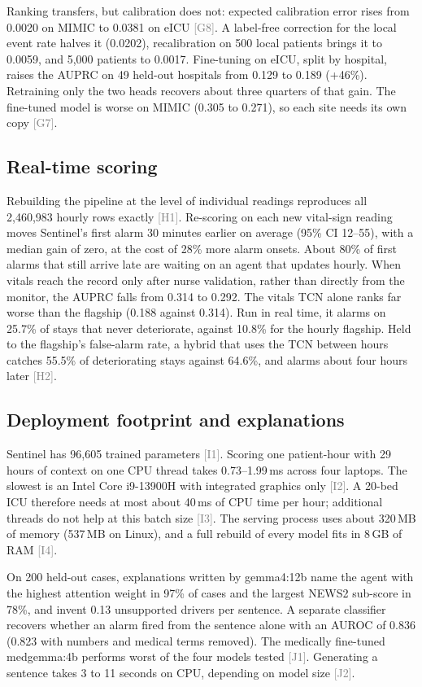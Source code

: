 \documentclass[11pt]{article}
\newcommand{\ev}[1]{\textcolor{gray}{\scriptsize[#1]}}   %
\begin{document}
Ranking transfers, but calibration does not: expected calibration error rises
from 0.0020 on MIMIC to 0.0381 on eICU \ev{G8}. A label-free correction for the
local event rate halves it (0.0202), recalibration on 500 local patients brings
it to 0.0059, and 5{,}000 patients to 0.0017. Fine-tuning on eICU, split by
hospital, raises the AUPRC on 49 held-out hospitals from 0.129 to 0.189 (+46\%).
Retraining only the two heads recovers about three quarters of that gain. The
fine-tuned model is worse on MIMIC (0.305 to 0.271), so each site needs its own
copy \ev{G7}.

\subsection{Real-time scoring}
Rebuilding the pipeline at the level of individual readings reproduces all
2{,}460{,}983 hourly rows exactly \ev{H1}. Re-scoring on each new vital-sign
reading moves Sentinel's first alarm 30 minutes earlier on average (95\% CI
12--55), with a median gain of zero, at the cost of 28\% more alarm onsets. About
80\% of first alarms that still arrive late are waiting on an agent that updates
hourly. When vitals reach the record only after nurse validation, rather than
directly from the monitor, the AUPRC falls from 0.314 to 0.292. The vitals TCN
alone ranks far worse than the flagship (0.188 against 0.314). Run in real time,
it alarms on 25.7\% of stays that never deteriorate, against 10.8\% for the
hourly flagship. Held to the flagship's false-alarm rate, a hybrid that uses the
TCN between hours catches 55.5\% of deteriorating stays against 64.6\%, and
alarms about four hours later \ev{H2}.

\subsection{Deployment footprint and explanations}
Sentinel has 96{,}605 trained parameters \ev{I1}. Scoring one patient-hour with
29 hours of context on one CPU thread takes 0.73--1.99\,ms across four laptops.
The slowest is an Intel Core i9-13900H with integrated graphics only \ev{I2}. A
20-bed ICU therefore needs at most about 40\,ms of CPU time per hour; additional
threads do not help at this batch size \ev{I3}. The serving process uses about
320\,MB of memory (537\,MB on Linux), and a full rebuild of every model fits in
8\,GB of RAM \ev{I4}.

On 200 held-out cases, explanations written by gemma4:12b name the agent with
the highest attention weight in 97\% of cases and the largest NEWS2 sub-score in
78\%, and invent 0.13 unsupported drivers per sentence. A separate classifier
recovers whether an alarm fired from the sentence alone with an AUROC of 0.836
(0.823 with numbers and medical terms removed). The medically fine-tuned
medgemma:4b performs worst of the four models tested \ev{J1}. Generating a
sentence takes 3 to 11 seconds on CPU, depending on model size \ev{J2}.
\end{document}

